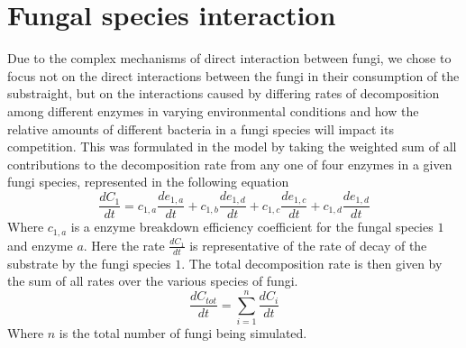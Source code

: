 \documentclass[10pt]{article}
\begin{document}
\section*{Fungal species interaction}
Due to the complex mechanisms of direct interaction between fungi, we chose to focus not on the direct interactions between the fungi in their consumption of the substraight, but on the interactions caused by differing rates of decomposition among different enzymes in varying environmental conditions and how the relative amounts of different bacteria in a fungi species will impact its competition. This was formulated in the model by taking the weighted sum of all contributions to the decomposition rate from any one of four enzymes in a given fungi species, represented in the following equation
\begin{equation} \label{eq}
    \frac{dC_{1}}{dt} = c_{1,a}\frac{de_{1,a}}{dt} + c_{1,b}\frac{de_{1,d}}{dt} + c_{1,c}\frac{de_{1,c}}{dt} + c_{1,d}\frac{de_{1,d}}{dt}
\end{equation}
Where $c_{1,a}$ is a enzyme breakdown efficiency coefficient for the fungal species $1$ and enzyme $a$. Here the rate $\frac{dC_{1}}{dt}$ is representative of the rate of decay of the substrate by the fungi species $1$. The total decomposition rate is then given by the sum of all rates over the various species of fungi.
\begin{equation} \label{eq}
    \frac{dC_{tot}}{dt} = \sum_{i=1}^{n}\frac{dC_{i}}{dt}
\end{equation}
Where $n$ is the total number of fungi being simulated. 
\end{document}
